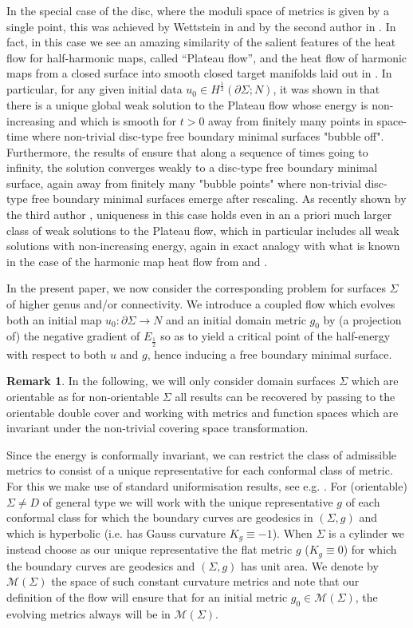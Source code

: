 \documentclass[10pt,reqno]{amsart}
\theoremstyle{plain}
\theoremstyle{definition}
\newtheorem{rmk}[lemma]{Remark}
\numberwithin{equation}{section}
\newcommand{\Si}{\Sigma}
\newcommand{\half}{\frac{1}{2}}
\newcommand{\MM}{\mathcal{M}} %
\newcommand{\hf}{\frac{1}{2}} %
\begin{document}
In the special case of the disc, where the moduli space of metrics is given by a single point, this was achieved by Wettstein in \cite{Wettstein_1,Wettstein_2,Wettstein_3} and by the second author in \cite{S}. In fact, in this case we see an amazing similarity of the salient features of the heat flow for half-harmonic maps, called ``Plateau flow'', and the heat flow of harmonic maps from a closed surface into smooth closed target manifolds laid out in \cite{Struwe-85}. In particular, for any given initial data $u_0\in H^\half(\partial\Si;N)$, it was shown in \cite{S} that there is a unique global weak solution to the Plateau flow whose energy is non-increasing and which is smooth for $t>0$ away from finitely many points in space-time where non-trivial disc-type free boundary minimal surfaces "bubble off". Furthermore, the results of \cite{S} ensure that along a sequence of times going to infinity, the solution converges weakly to a disc-type free boundary minimal surface, again away from finitely many "bubble points" where non-trivial disc-type free boundary minimal surfaces emerge after rescaling. As recently shown by the third author \cite{Wright}, uniqueness in this case holds even in an a priori much larger class of weak solutions to the Plateau flow, which in particular includes all weak solutions with non-increasing energy, again in exact analogy with what is known in the case of the harmonic map heat flow from \cite{Freire} and \cite{Rupflin_08}.

In the present paper, we now consider the corresponding problem for surfaces $\Si$ of higher genus and/or connectivity. We introduce a coupled flow which evolves both an initial map $u_0\colon\partial\Si\to N$ and an initial domain metric $g_0$ by (a projection of) the negative gradient of $E_\hf$ so as to yield a critical point of the half-energy with respect to both $u$ and $g$, hence inducing a free boundary minimal surface.

\begin{rmk}
	In the following, we will only consider domain surfaces $\Si$ which are orientable as for non-orientable $\Si$ all results can be recovered by passing to the orientable double cover and working with metrics and function spaces which are invariant under the non-trivial covering space transformation.
\end{rmk}
Since the energy is conformally invariant, we can restrict the class of admissible metrics to consist of a unique representative for each conformal class of metric. For this we make use of standard uniformisation results, see e.g. \cite{Osgood_Phillips_Sarnak}. For (orientable) $\Si\neq D$ of general type we will work with the unique representative $g$ of each conformal class for which the boundary curves are geodesics in $(\Si,g)$ and which is hyperbolic (i.e. has Gauss curvature $K_g\equiv -1$). When $\Si$ is a cylinder we instead choose as our unique representative the flat metric $g$  ($K_g\equiv 0$) for which the boundary curves are geodesics and $(\Si,g)$ has unit area. We denote by $\MM(\Sigma)$ the space of such constant curvature metrics and note that our definition of the flow will ensure that for an initial metric $g_0\in\MM(\Si)$, the evolving metrics always will be in $\MM(\Si)$.
\end{document}
